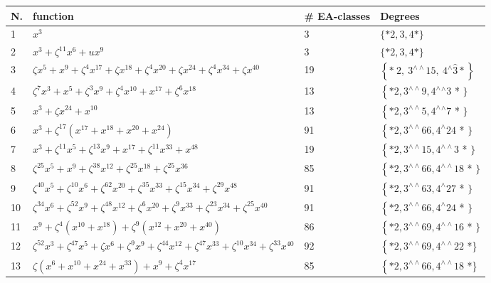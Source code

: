 \documentclass[10pt]{article}
\begin{document}
\begin{center}
\begin{tabular}{|l|l|l|l|}
\hline
N. & function & \# EA-classes & Degrees \\
\hline
1 & $x^{3}$ & 3 & $\{* 2,3,4 *\}$ \\
\hline
2 & $x^{3}+\zeta^{11} x^{6}+u x^{9}$ & 3 & $\{* 2,3,4 *\}$ \\
\hline
3 & $\zeta x^{5}+x^{9}+\zeta^{4} x^{17}+\zeta x^{18}+\zeta^{4} x^{20}+\zeta x^{24}+\zeta^{4} x^{34}+\zeta x^{40}$ & 19 & $\left\{* ~ 2, ~ 3^{\wedge \wedge} 15, ~ 4^{\wedge} \hat{3} *\right\}$ \\
\hline
4 & $\zeta^{7} x^{3}+x^{5}+\zeta^{3} x^{9}+\zeta^{4} x^{10}+x^{17}+\zeta^{6} x^{18}$ & 13 & $\left\{* 2,3^{\wedge \wedge} 9,4^{\wedge}{ }^{\wedge} 3\right.$ * $\}$ \\
\hline
5 & $x^{3}+\zeta x^{24}+x^{10}$ & 13 & $\left\{* 2,3^{\wedge \wedge} 5,4^{\wedge}{ }^{\wedge} 7\right.$ * $\}$ \\
\hline
6 & $x^{3}+\zeta^{17}\left(x^{17}+x^{18}+x^{20}+x^{24}\right)$ & 91 & $\left\{* 2,3^{\wedge \wedge} 66,4^{\wedge} 24\right.$ * $\}$ \\
\hline
7 & $x^{3}+\zeta^{11} x^{5}+\zeta^{13} x^{9}+x^{17}+\zeta^{11} x^{33}+x^{48}$ & 19 & $\left\{* 2,3^{\wedge \wedge} 15,4^{\wedge \wedge} 3\right.$ * $\}$ \\
\hline
8 & $\zeta^{25} x^{5}+x^{9}+\zeta^{38} x^{12}+\zeta^{25} x^{18}+\zeta^{25} x^{36}$ & 85 & $\left\{* 2,3^{\wedge \wedge} 66,4^{\wedge \wedge} 18\right.$ * $\}$ \\
\hline
9 & $\zeta^{40} x^{5}+\zeta^{10} x^{6}+\zeta^{62} x^{20}+\zeta^{35} x^{33}+\zeta^{15} x^{34}+\zeta^{29} x^{48}$ & 91 & $\left\{* 2,3^{\wedge \wedge} 63,4^{\wedge} 27\right.$ * $\}$ \\
\hline
10 & $\zeta^{34} x^{6}+\zeta^{52} x^{9}+\zeta^{48} x^{12}+\zeta^{6} x^{20}+\zeta^{9} x^{33}+\zeta^{23} x^{34}+\zeta^{25} x^{40}$ & 91 & $\left\{* 2,3^{\wedge \wedge} 66,4^{\wedge} 24\right.$ * $\}$ \\
\hline
11 & $x^{9}+\zeta^{4}\left(x^{10}+x^{18}\right)+\zeta^{9}\left(x^{12}+x^{20}+x^{40}\right)$ & 86 & $\left\{* 2,3^{\wedge \wedge} 69,4^{\wedge \wedge} 16\right.$ * $\}$ \\
\hline
12 & $\zeta^{52} x^{3}+\zeta^{47} x^{5}+\zeta x^{6}+\zeta^{9} x^{9}+\zeta^{44} x^{12}+\zeta^{47} x^{33}+\zeta^{10} x^{34}+\zeta^{33} x^{40}$ & 92 & $\left\{* 2,3^{\wedge \wedge} 69,4^{\wedge \wedge} 22\right.$ *\} \\
\hline
13 & $\zeta\left(x^{6}+x^{10}+x^{24}+x^{33}\right)+x^{9}+\zeta^{4} x^{17}$ & 85 & $\left\{* 2,3^{\wedge \wedge} 66,4^{\wedge \wedge} 18\right.$ *\} \\

\end{tabular}
\end{center}
\end{document}
